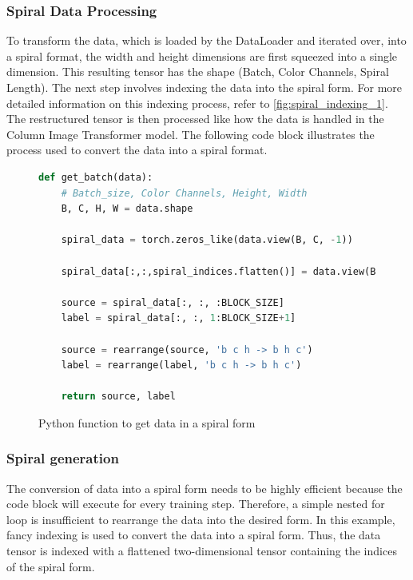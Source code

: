     \subsubsection{Spiral Data Processing}

    To transform the data, which is loaded by the DataLoader and iterated over, into a spiral format, the width and height dimensions are first squeezed into a single dimension. This resulting tensor has the shape (Batch, Color Channels, Spiral Length). The next step involves indexing the data into the spiral form. For more detailed information on this indexing process, refer to \autoref{fig:spiral_indexing_1}. The restructured tensor is then processed like how the data is handled in the Column Image Transformer model. The following code block illustrates the process used to convert the data into a spiral format.

    \begin{figure}[H]
        \centering
        \begin{lstlisting}[language=Python]
def get_batch(data):
    # Batch_size, Color Channels, Height, Width
    B, C, H, W = data.shape

    spiral_data = torch.zeros_like(data.view(B, C, -1))

    spiral_data[:,:,spiral_indices.flatten()] = data.view(B, C, -1)

    source = spiral_data[:, :, :BLOCK_SIZE]
    label = spiral_data[:, :, 1:BLOCK_SIZE+1]

    source = rearrange(source, 'b c h -> b h c')
    label = rearrange(label, 'b c h -> b h c')

    return source, label
        \end{lstlisting}
        \caption{Python function to get data in a spiral form}
        \label{fig:spiral_indexing_code}
    \end{figure}

    \subsubsection{Spiral generation}
    \label{sec:spiral_generation}
    The conversion of data into a spiral form needs to be highly efficient because the code block will execute for every training step. Therefore, a simple nested for loop is insufficient to rearrange the data into the desired form. In this example, fancy indexing is used to convert the data into a spiral form. Thus, the data tensor is indexed with a flattened two-dimensional tensor containing the indices of the spiral form.

